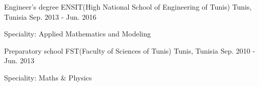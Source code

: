 

\begin{cventries}

  \cventry
    {Engineer's degree} %
    {ENSIT(High National School of Engineering of Tunis)} %
    {Tunis, Tunisia} %
    {Sep. 2013 - Jun. 2016} %
    {
      \begin{cvitems} %
				\item {Speciality: Applied Mathematics and Modeling}
      \end{cvitems}
    }

	\cventry
		{Preparatory school} %
		{FST(Faculty of Sciences of Tunis)} %
		{Tunis, Tunisia} %
		{Sep. 2010 - Jun. 2013} %
		{
			\begin{cvitems} %
				\item {Speciality: Maths \& Physics}
			\end{cvitems}
		}


\end{cventries}
